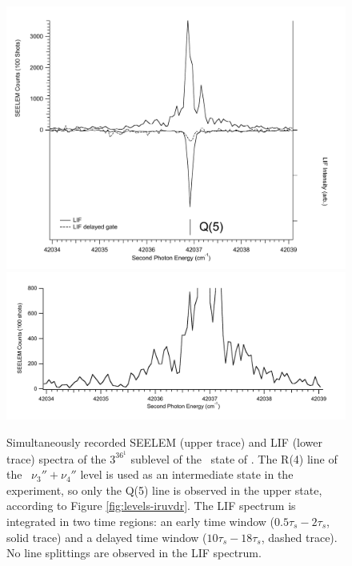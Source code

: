 \begin{figure}
  \caption{Simultaneously recorded SEELEM (upper trace) and LIF (lower
    trace) spectra of the $3^36^1$  sublevel of the \astate\
    state of .  The R(4) line of the \xstate\ $\nu_3'' +
    \nu_4''$ level is used as an intermediate state in the experiment,
    so only the Q(5) line is observed in the upper state, according to
    Figure \ref{fig:levels-iruvdr}.  The LIF spectrum is integrated in
    two time regions: an early time window ($0.5\tau_s-2\tau_s$, solid
    trace) and a delayed time window ($10\tau_s-18\tau_s$, dashed
    trace).  No line splittings are observed in the LIF spectrum.}
  \label{fig:3361-q5}
  \centering
  \includegraphics[width=6in]{spectrum-3361-q5-split.pdf}
  \includegraphics[width=6in]{spectrum-3361-q5-zoom.pdf}
\end{figure}


